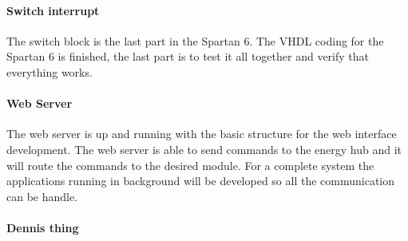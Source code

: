 \paragraph{Switch interrupt}
The switch block is the last part in the Spartan 6. The VHDL coding for the Spartan 6 is finished, the last part is to test it all together and verify that everything works.
%
%
\paragraph{Web Server}
The web server is up and running with the basic structure for the web interface development. The web server is able to send commands to the energy hub and it will route the commands to the desired module. For a complete system the applications running in background will be developed so all the communication can be handle.
%
%
\paragraph{Dennis thing}
%
%